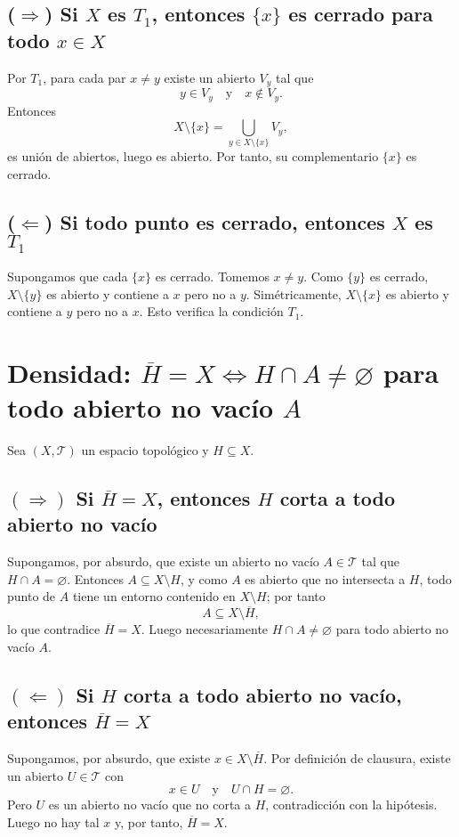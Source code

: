 \documentclass[12pt]{article}
\begin{document}
\subsection*{($\Rightarrow$) Si $X$ es $T_1$, entonces $\{x\}$ es cerrado para todo $x\in X$}
Por $T_1$, para cada par $x\neq y$ existe un abierto $V_y$ tal que
\[
y\in V_y \quad\text{y}\quad x\notin V_y.
\]
Entonces
\[
X\setminus\{x\}=\bigcup_{y\in X\setminus\{x\}} V_y,
\]
es unión de abiertos, luego es abierto. Por tanto, su complementario $\{x\}$ es cerrado.

\subsection*{($\Leftarrow$) Si todo punto es cerrado, entonces $X$ es $T_1$}
Supongamos que cada $\{x\}$ es cerrado. Tomemos $x\neq y$.
Como $\{y\}$ es cerrado, $X\setminus\{y\}$ es abierto y contiene a $x$ pero no a $y$.
Simétricamente, $X\setminus\{x\}$ es abierto y contiene a $y$ pero no a $x$.
Esto verifica la condición $T_1$.
\section*{Densidad: $\overline{H}=X \iff H\cap A\neq\varnothing$ para todo abierto no vacío $A$}

Sea $(X,\mathcal T)$ un espacio topológico y $H\subseteq X$.

\subsection*{$(\Rightarrow)$ Si $\overline{H}=X$, entonces $H$ corta a todo abierto no vacío}
Supongamos, por absurdo, que existe un abierto no vacío $A\in\mathcal T$ tal que $H\cap A=\varnothing$.
Entonces $A\subseteq X\setminus H$, y como $A$ es abierto que no intersecta a $H$,
todo punto de $A$ tiene un entorno contenido en $X\setminus H$; por tanto
\[
A\subseteq X\setminus \overline{H},
\]
lo que contradice $\overline{H}=X$. Luego necesariamente $H\cap A\neq\varnothing$ para todo abierto no vacío $A$.

\subsection*{$(\Leftarrow)$ Si $H$ corta a todo abierto no vacío, entonces $\overline{H}=X$}
Supongamos, por absurdo, que existe $x\in X\setminus \overline{H}$.
Por definición de clausura, existe un abierto $U\in\mathcal T$ con
\[
x\in U \quad\text{y}\quad U\cap H=\varnothing.
\]
Pero $U$ es un abierto no vacío que no corta a $H$, contradicción con la hipótesis.
Luego no hay tal $x$ y, por tanto, $\overline{H}=X$.
\end{document}
